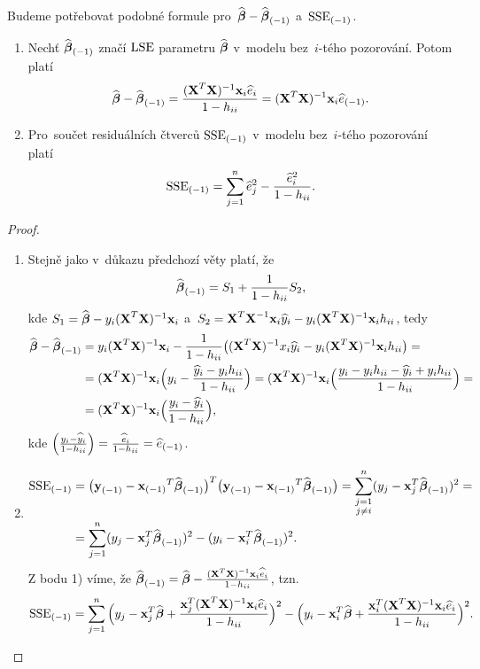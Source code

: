 

Budeme potřebovat podobné formule pro~$\widehat{\boldsymbol{\beta}}-\widehat{\boldsymbol{\beta}}_{(-1)}$ a~${\mathrm{SSE}_{(-1)}}$.

\begin{theorem}
	\begin{enumerate}[1)]
		\item Nechť ${\widehat{\boldsymbol{\beta}}_{(-1)}}$ značí $\mathrm{LSE}$ parametru $\widehat{\boldsymbol{\beta}}$ v~modelu bez~$i$-tého pozorování. Potom platí 
	$$ \widehat{\boldsymbol{\beta}}-{\widehat{\boldsymbol{\beta}}_{(-1)}}=\frac{(\textbf{X}^T\textbf{X})^{-1}\textbf{x}_i\widehat{e}_i}{1-h_{ii}}=(\textbf{X}^T\textbf{X})^{-1}\textbf{x}_i{\widehat{e}_{(-1)}}.$$
	\item Pro~součet residuálních čtverců ${\mathrm{SSE}_{(-1)}}$ v~modelu bez~$i$-tého pozorování platí
	$${\mathrm{SSE}_{(-1)}}=\sum\limits_{j=1}^{n} \widehat{e}_j^2-\frac{\widehat{e}_i^2}{1-h_{ii}}.$$
	\end{enumerate}
\begin{proof}
	\begin{enumerate}[1)]
		\item Stejně jako v~důkazu předchozí věty platí, že 
		$$ {\widehat{\boldsymbol{\beta}}_{(-1)}}=S_1+\frac{1}{1-h_{ii}}S_2,$$
		kde $S_1=\widehat{\boldsymbol{\beta}}-y_i(\textbf{X}^T\textbf{X})^{-1}\textbf{x}_i$ a~$S_2=\textbf{X}^T\textbf{X}^{-1}\textbf{x}_i\widehat{y}_i-y_i(\textbf{X}^T\textbf{X})^{-1} \textbf{x}_ih_{ii}$, tedy
		\[
		\begin{split}
		\widehat{\boldsymbol{\beta}}-{\widehat{\boldsymbol{\beta}}_{(-1)}}&=y_i(\textbf{X}^T\textbf{X})^{-1}\textbf{x}_i-\frac{1}{1-h_{ii}}\big((\textbf{X}^T\textbf{X})^{-1} x_i\widehat{y}_i-y_i(\textbf{X}^T\textbf{X})^{-1} \textbf{x}_ih_{ii}\big)=\\&=(\textbf{X}^T\textbf{X})^{-1} \textbf{x}_i\Big(y_i-\frac{\widehat{y}_i-y_ih_{ii}}{1-h_{ii}}\Big)=(\textbf{X}^T\textbf{X})^{-1} \textbf{x}_i\Big(\frac{y_i-y_ih_{ii}-\widehat{y}_i+y_ih_{ii}}{1-h_{ii}}\Big)=\\&=(\textbf{X}^T\textbf{X})^{-1} \textbf{x}_i\Big(\frac{y_i-\widehat{y}_i}{1-h_{ii}}\Big),
		\end{split}
		\] 
		kde $\Big(\frac{y_i-\widehat{y}_i}{1-h_{ii}}\Big)=\frac{\widehat{e}_i}{1-h_{ii}}={\widehat{e}_{(-1)}}$.
		\item \[
		\begin{split}
		{\mathrm{SSE}_{(-1)}}&=\big({\textbf{y}_{(-1)}}-{\textbf{x}_{(-1)}}^T{\widehat{\boldsymbol{\beta}}_{(-1)}}\big)^T\big({\textbf{y}_{(-1)}}-{\textbf{x}_{(-1)}}^T{\widehat{\boldsymbol{\beta}}_{(-1)}}\big)=\sum_{\substack{j=1\\j\neq i}}^{n}(y_j-\textbf{x}_j^T{\widehat{\boldsymbol{\beta}}_{(-1)}})^2=\\&=\sum\limits_{j=1}^{n} (y_j-\textbf{x}_j^T{\widehat{\boldsymbol{\beta}}_{(-1)}})^2-(y_i-\textbf{x}_i^T{\widehat{\boldsymbol{\beta}}_{(-1)}})^2.
		\end{split}
		\]
		Z bodu 1) víme, že ${\widehat{\boldsymbol{\beta}}_{(-1)}}=\widehat{\boldsymbol{\beta}}-\frac{(\textbf{X}^T\textbf{X})^{-1} \textbf{x}_i\widehat{e}_i}{1-h_{ii}}$, tzn.
		$$ {\mathrm{SSE}_{(-1)}}=\sum\limits_{j=1}^{n}\Big(y_j-\textbf{x}_j^T\widehat{\boldsymbol{\beta}}+\frac{\textbf{x}_j^T(\textbf{X}^T\textbf{X})^{-1} \textbf{x}_i\widehat{e}_i}{1-h_{ii}}\Big)^2-\Big(y_i-\textbf{x}_i^T\widehat{\boldsymbol{\beta}}+\frac{\textbf{x}_i^T(\textbf{X}^T\textbf{X})^{-1} \textbf{x}_i\widehat{e}_i}{1-h_{ii}}\Big)^2.$$

\end{enumerate}
\end{proof}
\end{theorem}
